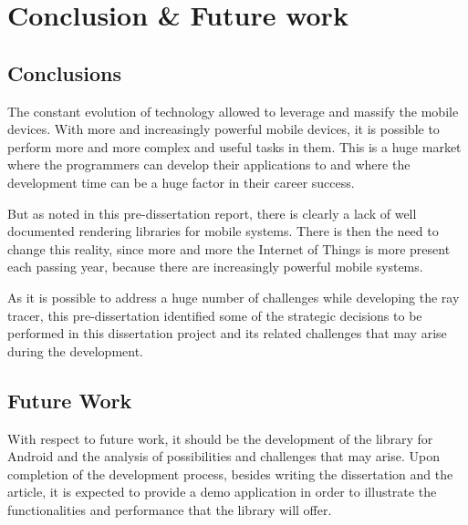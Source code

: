 \chapter{Conclusion \& Future work}

\section{Conclusions}

\par
The constant evolution of technology allowed to leverage and massify the mobile devices.
With more and increasingly powerful mobile devices, it is possible to perform more and more complex and useful tasks in them.
This is a huge market where the programmers can develop their applications to and where the development time can be a huge factor in their career success.

\par
But as noted in this pre-dissertation report, there is clearly a lack of well documented rendering libraries for mobile systems.
There is then the need to change this reality, since more and more the Internet of Things is more present each passing year, because there are increasingly powerful mobile systems.

\par
As it is possible to address a huge number of challenges while developing the ray tracer, this pre-dissertation identified some of the strategic decisions to be performed in this dissertation project and its related challenges that may arise during the development.

\section{Future Work}

\par
With respect to future work, it should be the development of the library for Android and the analysis of possibilities and challenges that may arise.
Upon completion of the development process, besides writing the dissertation and the article, it is expected to provide a demo application in order to illustrate the functionalities and performance that the library will offer.